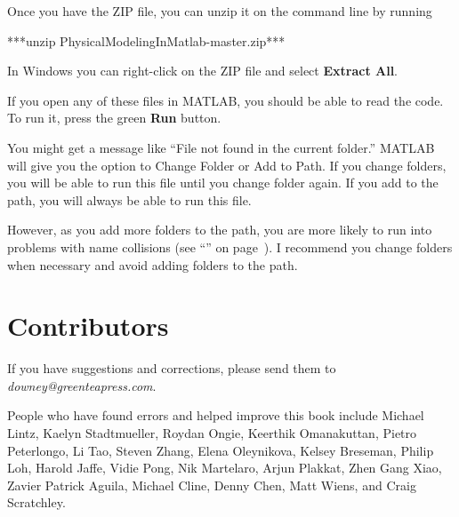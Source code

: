 Once you have the ZIP file, you can unzip it on the command line by running

\begin{code}
***unzip PhysicalModelingInMatlab-master.zip***
\end{code}

In Windows you can right-click on the ZIP file and select \textbf{Extract All}.

If you open any of these files in MATLAB, you should be able to read the code.  To run it, press the green \textbf{Run} button.

You might get a message like ``File not found in the current folder.''
MATLAB will give you the option to Change Folder or Add to Path.  If you change folders, you will be able to run this file until you change folder again.  If you add to the path, you will always be able to run this file.

However, as you add more folders to the path, you are more likely to run into problems with name collisions (see ``'' on page~\pageref{collision}).
I recommend you change folders when necessary and avoid adding folders to the path.


\newpage

\section*{Contributors}

If you have suggestions and corrections, please send them to
\emph{downey@greenteapress.com}.

People who have found errors and helped improve this book include
Michael Lintz,
Kaelyn Stadtmueller,
Roydan Ongie,
Keerthik Omanakuttan,
Pietro Peterlongo,
Li Tao,
Steven Zhang,
Elena Oleynikova,
Kelsey Breseman,
Philip Loh,
Harold Jaffe,
Vidie Pong,
Nik Martelaro,
Arjun Plakkat,
Zhen Gang Xiao,
Zavier Patrick Aguila,
Michael Cline,
Denny Chen,
Matt Wiens,
and Craig Scratchley.

\newpage
